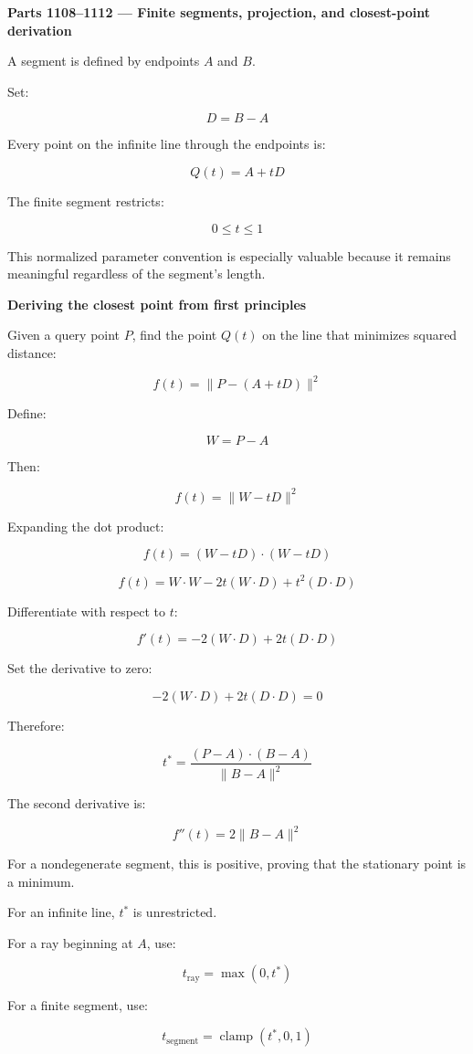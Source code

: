 \textbf{Parts 1108--1112 --- Finite segments, projection, and closest-point derivation}

A segment is defined by endpoints \(A\) and \(B\).

Set:

\[
D=B-A
\]

Every point on the infinite line through the endpoints is:

\[
Q(t)=A+tD
\]

The finite segment restricts:

\[
0\le t\le1
\]

This normalized parameter convention is especially valuable because it remains meaningful regardless of the segment's length.

\textbf{Deriving the closest point from first principles}

Given a query point \(P\), find the point \(Q(t)\) on the line that minimizes squared distance:

\[
f(t)=\|P-(A+tD)\|^2
\]

Define:

\[
W=P-A
\]

Then:

\[
f(t)=\|W-tD\|^2
\]

Expanding the dot product:

\[
f(t) =(W-tD)\cdot(W-tD)
\]

\[
f(t)=W\cdot W-2t(W\cdot D)+t^2(D\cdot D)
\]

Differentiate with respect to \(t\):

\[
f'(t)=-2(W\cdot D)+2t(D\cdot D)
\]

Set the derivative to zero:

\[
-2(W\cdot D)+2t(D\cdot D)=0
\]

Therefore:

\[
\boxed{ t^*=\frac{(P-A)\cdot(B-A)}{\|B-A\|^2} }
\]

The second derivative is:

\[
f''(t)=2\|B-A\|^2
\]

For a nondegenerate segment, this is positive, proving that the stationary point is a minimum.

For an infinite line, \(t^*\) is unrestricted.

For a ray beginning at \(A\), use:

\[
t_{\mathrm{ray}}=\max(0,t^*)
\]

For a finite segment, use:

\[
\boxed{ t_{\mathrm{segment}}=\operatorname{clamp}(t^*,0,1) }
\]

